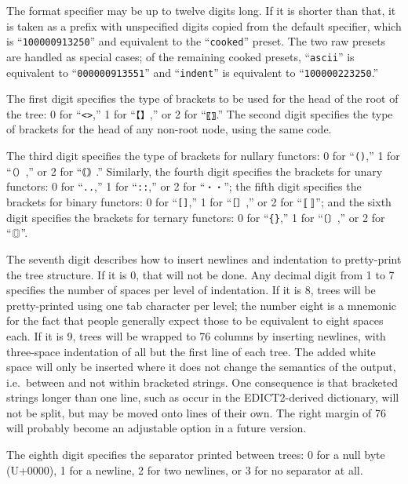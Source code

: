 \documentclass[twocolumn]{report}
\begin{document}
The format specifier may be up to twelve digits long.  If it is shorter than
that, it is taken as a prefix with unspecified digits copied from the
default specifier, which is ``\texttt{100000913250}'' and equivalent to the
``\texttt{cooked}'' preset.  The two raw presets are handled as special
cases; of the remaining cooked presets, ``\texttt{ascii}'' is equivalent to
``\texttt{000000913551}'' and ``\texttt{indent}'' is equivalent to
``\texttt{100000223250}.''

The first digit specifies the type of brackets to be used for the head of
the root of the tree: 0 for ``\texttt{<>},'' 1 for ``\texttt{【】},'' or 2
for ``\texttt{〖〗}.''  The second digit specifies the type of brackets for
the head of any non-root node, using the same code.

The third digit specifies the type of brackets for nullary functors:  0 for
``\texttt{()},'' 1 for ``\texttt{（）},'' or 2 for ``\texttt{｟｠}.''
Similarly, the fourth digit specifies the brackets for unary functors:
0 for ``\texttt{..},'' 1 for ``\texttt{::},'' or 2 for ``\texttt{・・}'';
the fifth digit specifies the brackets for binary functors:
0 for ``\texttt{[]},'' 1 for ``\texttt{［］},'' or 2 for ``\texttt{〚〛}'';
and the sixth digit specifies the brackets for ternary functors:
0 for ``\texttt{\{\}},'' 1 for ``\texttt{〔〕},'' or 2 for
``\texttt{〘〙}''.

The seventh digit describes how to insert newlines and indentation to
pretty-print the tree structure.  If it is 0, that will not be done.  Any
decimal digit from 1 to 7 specifies the number of spaces per level of
indentation.  If it is 8, trees will be pretty-printed using one tab
character per level; the number eight is a mnemonic for the fact that people
generally expect those to be equivalent to eight spaces each.  If it is 9,
trees will be wrapped to 76 columns by inserting newlines, with three-space
indentation of all but the first line of each tree.  The added white space
will only be inserted where it does not change the semantics of the output,
i.e.\ between and not within bracketed strings.  One consequence is that
bracketed strings longer than one line, such as occur in the EDICT2-derived
dictionary, will not be split, but may be moved onto lines of their own. 
The right margin of 76 will probably become an adjustable option in a future
version.

The eighth digit specifies the separator printed between trees: 0 for a null
byte (U+0000), 1 for a newline, 2 for two newlines, or 3 for no separator at
all.
\end{document}
